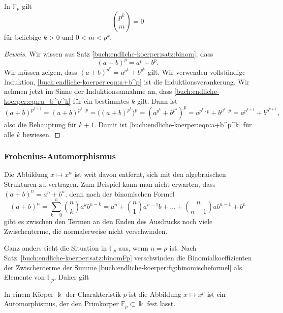 \begin{satz}
\label{buch:endliche-koerper:satz:binomFp}
In $\mathbb{F}_p$ gilt
\[
\binom{p^k}{m}=0
\]
für beliebige $k>0$ und $0<m<p^k$.
\end{satz}
\begin{proof}[Beweis]
Wir wissen aus Satz \ref{buch:endliche-koerper:satz:binom}, dass 
\begin{equation}
(a+b)^p = a^p+b^p.
\label{buch:endliche-koerper:eqn:a+b^p}
\end{equation}
Wir müssen zeigen, dass $(a+b)^{p^k}=a^{p^k}+b^{p^k}$ gilt.
Wir verwenden vollständige Induktion, 
\eqref{buch:endliche-koerper:eqn:a+b^p} ist die Induktionsverankerung.
Wir nehmen jetzt im Sinne der Induktionsannahme an, dass
\eqref{buch:endliche-koerper:eqn:a+b^p^k} für ein bestimmtes $k$ gilt.
Dann ist
\[
(a+b)^{p^{k+1}}
=
(a+b)^{p^k\cdot p}
=
\bigl((a+b)^{p^k}\bigr)^p
=
(a^{p^k}+b^{p^k})^p
=
a^{p^k\cdot p}+b^{p^k\cdot p}
=
a^{p^{k+1}}
+
b^{p^{k+1}},
\]
also die Behauptung für $k+1$.
Damit ist
\eqref{buch:endliche-koerper:eqn:a+b^p^k} für alle $k$ bewiesen.
\end{proof}


\subsubsection{Frobenius-Automorphismus}
Die Abbildung $x\mapsto x^n$ ist weit davon entfernt, sich mit den
algebraischen Strukturen zu vertragen.
Zum Beispiel kann man nicht erwarten, dass $(a+b)^n = a^n + b^n$,
denn nach der binomischen Formel
\begin{equation}
(a+b)^n
=
\sum_{k=0}^n \binom{n}{k} a^k b^{n-k}
=
a^n + \binom{n}{1}a^{n-1}b + \dots + \binom{n}{n-1}ab^{n-1} + b^n
\label{buch:endliche-koerper:fig:binomischeformel}
\end{equation}
gibt es zwischen den Termen an den Enden des Ausdrucks noch viele
Zwischenterme, die normalerweise nicht verschwinden.

Ganz anders sieht die Situation in $\mathbb{F}_p$ aus, wenn $n=p$ ist.
Nach Satz~\ref{buch:endliche-koerper:satz:binomFp} verschwinden die
Binomialkoeffizienten der Zwischenterme der Summe
\eqref{buch:endliche-koerper:fig:binomischeformel}
als Elemente von $\mathbb{F}_p$.
Daher gilt
%

\begin{satz}
\label{buch:endliche-koerper:satz:frobenius}
In einem Körper $\Bbbk$ der Charakteristik $p$ ist die Abbildung
$x\mapsto x^p$ ist ein Automorphismus, der den Primkörper 
$\mathbb{F}_p\subset\Bbbk$ fest lässt.
\end{satz}

